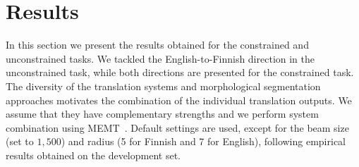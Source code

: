 \documentclass[postprint]{flammie}
\begin{document}




\section{Results}
\label{section:results}
%
In this section we present the results obtained for the constrained and unconstrained tasks.
We tackled the English-to-Finnish direction in the unconstrained task, while both directions are presented for the constrained task. The diversity of the translation systems and morphological segmentation approaches motivates the combination of the individual translation outputs. We assume that they have complementary strengths and we perform system combination using MEMT~\cite{heafield2010combining}. Default settings are used, except for the beam size (set to $1,500$) and radius (5 for Finnish and 7 for English), following empirical results obtained on the development set.
%
\end{document}
